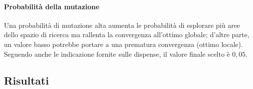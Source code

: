 \paragraph{Probabilità della mutazione}
Una probabilità di mutazione alta aumenta le probabilità di esplorare più aree dello spazio di ricerca
ma rallenta la convergenza all'ottimo globale; d'altre parte, un valore basso potrebbe portare a una prematura convergenza (ottimo locale).
Seguendo anche le indicazione fornite sulle dispense, il valore finale scelto è $0,05$.
\subsection{Risultati}\label{subsec:risultati}
